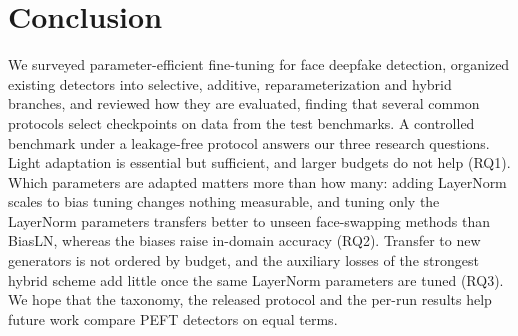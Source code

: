 \documentclass[fonts]{icst}
\begin{document}
\section{Conclusion}
We surveyed parameter-efficient fine-tuning for face deepfake detection, organized existing detectors into selective, additive, reparameterization and hybrid branches, and reviewed how they are evaluated, finding that several common protocols select checkpoints on data from the test benchmarks. A controlled benchmark under a leakage-free protocol answers our three research questions. Light adaptation is essential but sufficient, and larger budgets do not help (RQ1). Which parameters are adapted matters more than how many: adding LayerNorm scales to bias tuning changes nothing measurable, and tuning only the LayerNorm parameters transfers better to unseen face-swapping methods than BiasLN, whereas the biases raise in-domain accuracy (RQ2). Transfer to new generators is not ordered by budget, and the auxiliary losses of the strongest hybrid scheme add little once the same LayerNorm parameters are tuned (RQ3). We hope that the taxonomy, the released protocol and the per-run results help future work compare PEFT detectors on equal terms.
\end{document}
